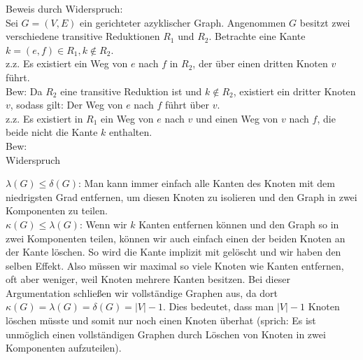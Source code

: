 \documentclass[11pt]{scrartcl} %
\begin{document}
\begin{compactenum}[(a)]
\item Beweis durch Widerspruch:\\
Sei $G=(V,E)$ ein gerichteter azyklischer Graph. Angenommen $G$ besitzt zwei verschiedene transitive Reduktionen $R_1$ und $R_2$. Betrachte eine Kante $k=(e,f) \in R_1, k \notin R_2$. \\
z.z. Es existiert ein Weg von $e$ nach $f$ in $R_2$, der über einen dritten Knoten $v$ führt.\\
Bew: Da $R_2$ eine transitive Reduktion ist und $k \notin R_2$, existiert ein dritter Knoten $v$, sodass gilt: Der Weg von $e$ nach $f$ führt über $v$.\\
z.z. Es existiert in $R_1$ ein Weg von $e$ nach $v$ und einen Weg von $v$ nach $f$, die beide nicht die Kante $k$ enthalten.
\\
Bew: 
\\
Widerspruch
\\
\item $\lambda(G) \le \delta(G)$: Man kann immer einfach alle Kanten des Knoten mit dem niedrigsten Grad entfernen, um diesen Knoten zu isolieren und den Graph in zwei Komponenten zu teilen.\\
$\kappa(G) \le \lambda(G)$: Wenn wir $k$ Kanten entfernen können und den Graph so in zwei Komponenten teilen, können wir auch einfach einen der beiden Knoten an der Kante löschen. So wird die Kante implizit mit gelöscht und wir haben den selben Effekt. Also müssen wir maximal so viele Knoten wie Kanten entfernen, oft aber weniger, weil Knoten mehrere Kanten besitzen. Bei dieser Argumentation schließen wir vollständige Graphen aus, da dort $\kappa(G)=\lambda(G)=\delta(G)=|V|-1$. Dies bedeutet, dass man $|V|-1$ Knoten löschen müsste und somit nur noch einen Knoten überhat (sprich: Es ist unmöglich einen vollständigen Graphen durch Löschen von Knoten in zwei Komponenten aufzuteilen).

\end{compactenum}
\end{document}
